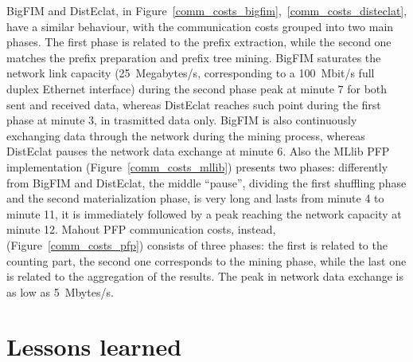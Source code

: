 BigFIM and DistEclat, in
Figure~\ref{comm_costs_bigfim},~\ref{comm_costs_disteclat}, have a similar
behaviour, with the communication costs grouped into two main phases.
The first phase is related to the prefix extraction,
while the second one matches the prefix preparation and prefix tree mining.
BigFIM saturates the network link capacity (25~Megabytes/s, corresponding to
a 100~Mbit/s full duplex Ethernet interface) during the second phase peak
at minute 7 for both sent and received data,
whereas DistEclat reaches such point during the first phase at minute 3,
in trasmitted data only.
BigFIM is also continuously exchanging data through the network during the
mining process, whereas DistEclat pauses the network data exchange at minute 6.
Also the MLlib PFP implementation (Figure~\ref{comm_costs_mllib})
presents two phases: differently from BigFIM and DistEclat, the middle ``pause'',
dividing the first shuffling phase and the second materialization phase,
is very long and lasts from minute 4 to minute 11,
it is immediately followed by a peak reaching the network capacity
at minute 12.
Mahout PFP communication costs, instead, (Figure~\ref{comm_costs_pfp})
consists of three phases:
the first is related to the counting part,
the second one corresponds to the mining phase,
while the last one is related to the aggregation of the results.
The peak in network data exchange is as low as 5~Mbytes/s.



%




\section{Lessons learned}
\label{lesson}



